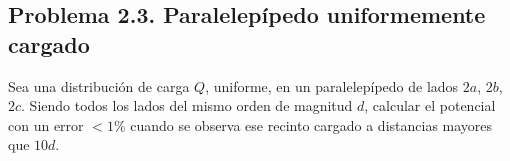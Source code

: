 \subsection{Problema 2.3. Paralelepípedo uniformemente cargado}\label{sem:paralelepipedo}
\begin{ejercicio}\label{ejer:paralelepipedo}
Sea una distribución de carga $Q$, uniforme, en un paralelepípedo de lados $2a$, $2b$, $2c$. Siendo todos los lados del mismo orden de magnitud $d$, calcular el potencial con un
error $<1\%$ cuando se observa ese recinto cargado a distancias mayores que $10d$.
\end{ejercicio}

